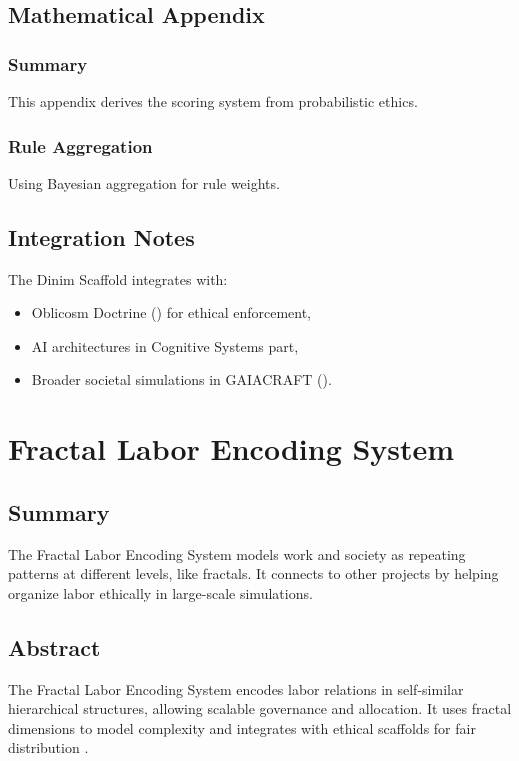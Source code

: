 \documentclass[11pt,oneside]{memoir}
\theoremstyle{plain}
\begin{document}
\section{Mathematical Appendix}
\subsection{Summary}
This appendix derives the scoring system from probabilistic ethics.

\subsection{Rule Aggregation}
Using Bayesian aggregation for rule weights.

\section{Integration Notes}
The Dinim Scaffold integrates with:
\begin{itemize}
    \item Oblicosm Doctrine () for ethical enforcement,
    \item AI architectures in Cognitive Systems part,
    \item Broader societal simulations in GAIACRAFT ().
\end{itemize}

\chapter{Fractal Labor Encoding System}
\label{sec:fractal_labor}

\section{Summary}
The Fractal Labor Encoding System models work and society as repeating patterns at different levels, like fractals. It connects to other projects by helping organize labor ethically in large-scale simulations.

\section{Abstract}
The Fractal Labor Encoding System encodes labor relations in self-similar hierarchical structures, allowing scalable governance and allocation. It uses fractal dimensions to model complexity and integrates with ethical scaffolds for fair distribution \cite{fractal_brain}.
\end{document}
